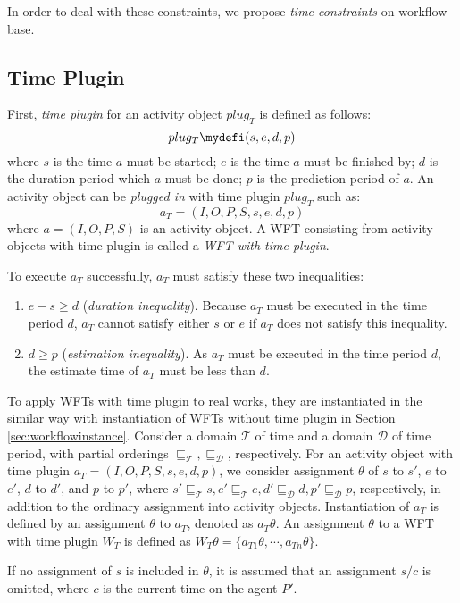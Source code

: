 In order to deal with these constraints, we propose \emph{time
constraints} on workflow-base.  

\subsection{Time Plugin}
\label{sec:timeplugin}
First, \emph{time plugin} for an activity object $plug_T$ is defined 
as follows:
\[
 plug_T \mydefi (s, e, d, p)
\]
where $s$ is the time $a$ must be started; $e$ is the time $a$ must be
finished by; $d$ is the duration period which $a$ must be done; $p$ is
the prediction period of $a$.  
An activity object can be \emph{plugged in} with time plugin $plug_T$
such as:
\[
 a_T =(I, O, P, S, s, e, d, p)
\]
where $a = (I, O, P, S)$ is an activity object.  A WFT consisting from
activity objects with time plugin is called a \emph{WFT with time
plugin}.

To execute $a_T$ successfully, $a_T$ must satisfy these two inequalities:
\begin{enumerate}
 \item $e-s \geq d$ (\emph{duration inequality}).  Because $a_T$ must
       be executed in the time period $d$, $a_T$ cannot satisfy either
       $s$ or $e$ if $a_T$ does not satisfy this inequality.
 \item $d \geq p$ (\emph{estimation inequality}).  As $a_T$ must be
       executed in the time period $d$, the estimate time of $a_T$ must
       be less than $d$.
\end{enumerate}

To apply WFTs with time plugin to real works, they are instantiated in
the similar way with instantiation of WFTs without time plugin in
Section \ref{sec:workflowinstance}.  Consider a domain $\mathcal{T}$ of
time and a domain $\mathcal{D}$ of time period, with partial orderings
$\sqsubseteq_\mathcal{T}, \sqsubseteq_\mathcal{D}$, respectively.  For
an activity object with time plugin $a_T = (I, O, P, S, s, e, d, p)$, we
consider assignment $\theta$ of $s$ to $s'$, $e$ to $e'$, $d$ to $d'$,
and $p$ to $p'$, where  $s' \sqsubseteq_\mathcal{T} s, e'
\sqsubseteq_\mathcal{T} e, d' \sqsubseteq_\mathcal{D} d, p'
\sqsubseteq_\mathcal{D} p$, respectively, in addition to the ordinary
assignment into activity objects.  Instantiation of $a_T$ is
defined by an assignment $\theta$ to $a_T$, denoted as $a_T\theta$.  An
assignment $\theta$ to a WFT with time plugin $W_T$ is defined as
$W_T\theta = \{a_{T1}\theta, \cdots, a_{Tn}\theta\}$.  

If no assignment of $s$ is included in $\theta$, it is assumed that an
assignment $s/c$ is omitted, where $c$ is the current time on the agent
$P'$.

